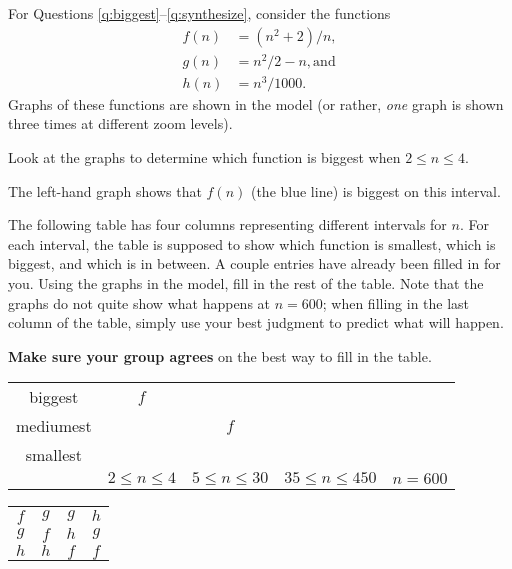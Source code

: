 \documentclass{tufte-handout}
\begin{document}
For Questions \ref{q:biggest}--\ref{q:synthesize}, consider the functions
\begin{align*}
  f(n) &= (n^2 + 2)/n, \\ g(n) &= n^2/2 - n, \text{and} \\ h(n) &= n^3/1000.
\end{align*}
Graphs of these functions are shown in the model (or rather,
\emph{one} graph is shown three times at different zoom levels).
\begin{questions}
\item \label{q:biggest} Look at the graphs to determine which function is
  biggest when $2 \leq n \leq 4$.
  \begin{answer}
    The left-hand graph shows that $f(n)$ (the blue line) is biggest
    on this interval.
  \end{answer}
\item \label{q:table} The following table has four columns
  representing different intervals for $n$.  For each interval, the
  table is supposed to show which function is smallest, which is
  biggest, and which is in between. A couple entries have already been
  filled in for you.  Using the graphs in the model, fill in the rest
  of the table. Note that the graphs do not quite show what happens at
  $n = 600$; when filling in the last column of the table, simply use
  your best judgment to predict what will happen.

  \textbf{Make sure your group agrees} on the best way to fill in the table.

  \setlength{\tabcolsep}{20pt}
  \renewcommand{\arraystretch}{2}
  \begin{fullwidth}
  \begin{tabular}{c|cccc}
    biggest & $f$ & & & \\
    mediumest & & $f$ & & \\
    smallest & & & & \\
    \hline
        & $2 \leq n \leq 4$ & $5 \leq n \leq 30$ & $35 \leq n \leq 450$ & $n = 600$
  \end{tabular}
  \end{fullwidth}

  \begin{answer}
    \setlength{\tabcolsep}{20pt}
    \renewcommand{\arraystretch}{1}
    \begin{tabular}{cccc}
    $f$ & $g$ & $g$ & $h$ \\
    $g$ & $f$ & $h$ & $g$ \\
    $h$ & $h$ & $f$ & $f$
    \end{tabular}
  \end{answer}


\end{questions}
\end{document}
